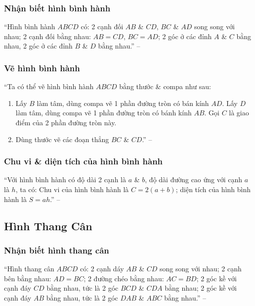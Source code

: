 \documentclass{article}
\numberwithin{equation}{section}
\begin{document}
\subsubsection{Nhận biết hình bình hành}
``Hình bình hành $ABCD$ có: 2 cạnh đối $AB$ \& $CD$, $BC$ \& $AD$ song song với nhau; 2 cạnh đối bằng nhau: $AB = CD$, $BC = AD$; 2 góc ở các đỉnh $A$ \& $C$ bằng nhau, 2 góc ở các đỉnh $B$ \& $D$ bằng nhau.'' -- \cite[p. 102]{Thai_Anh_Dat_Ha_Loan_Nam_Quang_Toan_6_tap_1}

\subsubsection{Vẽ hình bình hành}
``Ta có thể vẽ hình bình hành $ABCD$ bằng thước \& compa như sau:
\begin{enumerate}
	\item Lấy $B$ làm tâm, dùng compa vẽ 1 phần đường tròn có bán kính $AD$. Lấy $D$ làm tâm, dùng compa vẽ 1 phần đường tròn có bánh kính $AB$. Gọi $C$ là giao điểm của 2 phần đường tròn này.
	\item Dùng thước vẽ các đoạn thẳng $BC$ \& $CD$.'' -- \cite[p. 103]{Thai_Anh_Dat_Ha_Loan_Nam_Quang_Toan_6_tap_1}
\end{enumerate}

\subsubsection{Chu vi \& diện tích của hình bình hành}
``Với hình bình hành có độ dài 2 cạnh là $a$ \& $b$, độ dài đường cao ứng với cạnh $a$ là $h$, ta có: Chu vi của hình bình hành là $C = 2(a + b)$; diện tích của hình bình hành là $S = ah$.'' -- \cite[p. 103]{Thai_Anh_Dat_Ha_Loan_Nam_Quang_Toan_6_tap_1}

\subsection{Hình Thang Cân}

\subsubsection{Nhận biết hình thang cân}
``Hình thang cân $ABCD$ có: 2 cạnh dáy $AB$ \& $CD$ song song với nhau; 2 cạnh bên bằng nhau: $AD = BC$; 2 đường chéo bằng nhau: $AC = BD$; 2 góc kề với cạnh đáy $CD$ bằng nhau, tức là 2 góc $BCD$ \& $CDA$ bằng nhau; 2 góc kề với cạnh đáy $AB$ bằng nhau, tức là 2 góc $DAB$ \& $ABC$ bằng nhau.'' -- \cite[p. 105]{Thai_Anh_Dat_Ha_Loan_Nam_Quang_Toan_6_tap_1}
\end{document}
